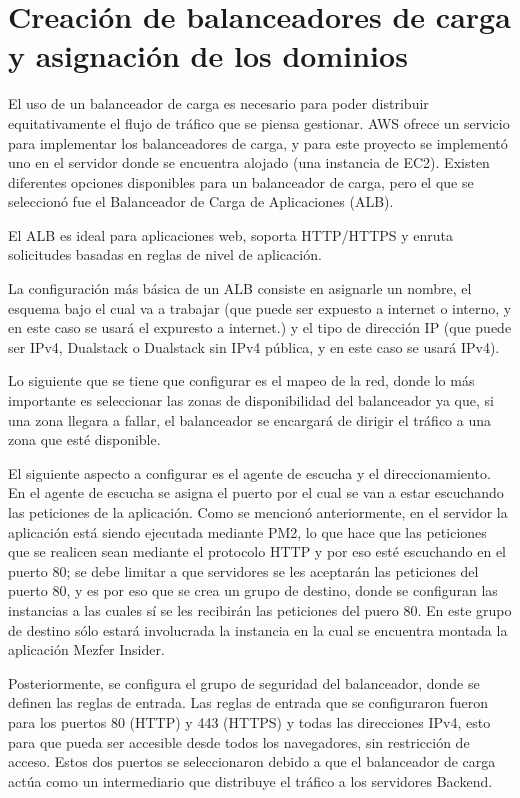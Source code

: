 \section{Creación de balanceadores de carga y asignación de los dominios}
El uso de un balanceador de carga es necesario para poder distribuir equitativamente el flujo de tráfico que se piensa gestionar. AWS ofrece un servicio para implementar los balanceadores de carga, y para este proyecto se implementó uno en el servidor donde se encuentra alojado (una instancia de EC2). Existen diferentes opciones disponibles para un balanceador de carga, pero el que se seleccionó fue el Balanceador de Carga de Aplicaciones (ALB).

El ALB es ideal para aplicaciones web, soporta HTTP/HTTPS y enruta solicitudes basadas en reglas de nivel de aplicación. 

La configuración más básica de un ALB consiste en asignarle un nombre, el esquema bajo el cual va a trabajar (que puede ser expuesto a internet o interno, y en este caso se usará el expuresto a internet.) y el tipo de dirección IP (que puede ser IPv4, Dualstack o Dualstack sin IPv4 pública, y en este caso se usará IPv4).

Lo siguiente que se tiene que configurar es el mapeo de la red, donde lo más importante es seleccionar las zonas de disponibilidad del balanceador ya que, si una zona llegara a fallar, el balanceador se encargará de dirigir el tráfico a una zona que esté disponible.

El siguiente aspecto a configurar es el agente de escucha y el direccionamiento. En el agente de escucha se asigna el puerto por el cual se van a estar escuchando las peticiones de la aplicación. Como se mencionó anteriormente, en el servidor la aplicación está siendo ejecutada mediante PM2, lo que hace que las peticiones que se realicen sean mediante el protocolo HTTP y por eso esté escuchando en el puerto 80; se debe limitar a que servidores se les aceptarán las peticiones del puerto 80, y es por eso que se crea un grupo de destino, donde se configuran las instancias a las cuales sí se les recibirán las peticiones del puero 80. En este grupo de destino sólo estará involucrada la instancia en la cual se encuentra montada la aplicación Mezfer Insider.

Posteriormente, se configura el grupo de seguridad del balanceador, donde se definen las reglas de entrada. Las reglas de entrada que se configuraron fueron para los puertos 80 (HTTP) y 443 (HTTPS) y todas las direcciones IPv4, esto para que pueda ser accesible desde todos los navegadores, sin restricción de acceso. Estos dos puertos se seleccionaron debido a que el balanceador de carga actúa como un intermediario que distribuye el tráfico a los servidores Backend. 

